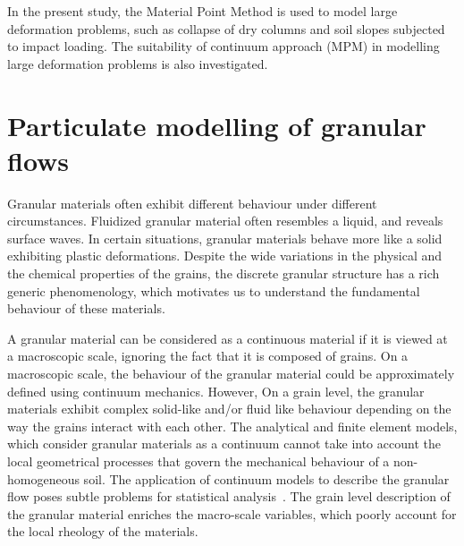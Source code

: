 In the present study, the Material Point Method is used to model large 
deformation problems, such as collapse of dry columns and soil slopes subjected 
to impact loading. The suitability of continuum approach (MPM) in modelling 
large deformation problems is also investigated.

\section{Particulate modelling of granular flows}

Granular materials often exhibit different behaviour under different 
circumstances. Fluidized granular material often resembles a liquid, and 
reveals surface waves. In certain situations, granular materials behave more 
like a solid exhibiting plastic deformations. Despite the wide variations in 
the physical and the chemical properties of the grains, the discrete granular 
structure has a rich generic phenomenology, which motivates us to understand 
the fundamental behaviour of these materials. 

A granular material can be 
considered as a continuous material if it is viewed at a macroscopic scale, 
ignoring the fact that it is composed of grains. On a macroscopic scale, the 
behaviour of the granular material could be approximately defined using 
continuum mechanics. However, On a grain level, the granular materials 
exhibit complex solid-like and/or fluid like behaviour depending on the way the 
grains interact with each other. The analytical and finite element models, 
which consider granular materials as a continuum cannot take into account the 
local geometrical processes that govern the mechanical behaviour of a 
non-homogeneous soil. The application of continuum models to describe the 
granular flow poses subtle problems for statistical analysis~\citep{mehta1994}. 
The grain level description of the granular material enriches the macro-scale 
variables, which poorly account for the local rheology of the materials. 

